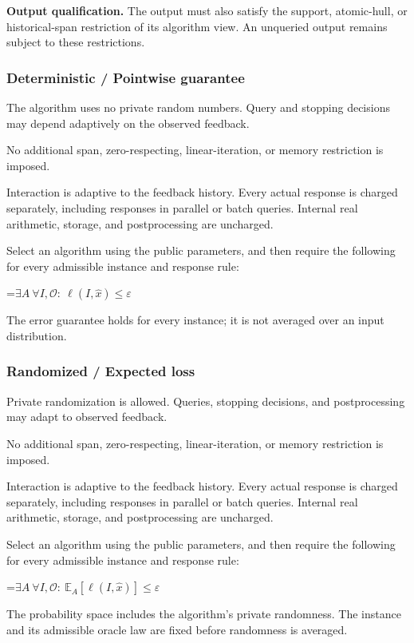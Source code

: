 \documentclass[10pt,a4paper]{article}
\newcommand{\AtlasMath}[1]{\par\begingroup\centering\setbox0=\hbox{$\displaystyle #1$}\ifdim\wd0>1.4\linewidth\typeout{ATLAS WIDE FORMULA: \the\wd0}\fi\ifdim\wd0>\linewidth\resizebox{\linewidth}{!}{\box0}\else\box0\fi\par\endgroup}
\begin{document}
\textbf{Output qualification.} The output must also satisfy the support, atomic-hull, or historical-span restriction of its algorithm view. An unqueried output remains subject to these restrictions.

\subsubsection{Deterministic / Pointwise guarantee}
The algorithm uses no private random numbers. Query and stopping decisions may depend adaptively on the observed feedback.

No additional span, zero-respecting, linear-iteration, or memory restriction is imposed.

Interaction is adaptive to the feedback history. Every actual response is charged separately, including responses in parallel or batch queries. Internal real arithmetic, storage, and postprocessing are uncharged.

Select an algorithm using the public parameters, and then require the following for every admissible instance and response rule:


\AtlasMath{\exists A\ \forall I,\mathcal{O}:\ \ell(I,\widehat{x})\le\varepsilon}


The error guarantee holds for every instance; it is not averaged over an input distribution.

\subsubsection{Randomized / Expected loss}
Private randomization is allowed. Queries, stopping decisions, and postprocessing may adapt to observed feedback.

No additional span, zero-respecting, linear-iteration, or memory restriction is imposed.

Interaction is adaptive to the feedback history. Every actual response is charged separately, including responses in parallel or batch queries. Internal real arithmetic, storage, and postprocessing are uncharged.

Select an algorithm using the public parameters, and then require the following for every admissible instance and response rule:


\AtlasMath{\exists A\ \forall I,\mathcal{O}:\ \mathbb{E}_A[\ell(I,\widehat{x})]\le\varepsilon}


The probability space includes the algorithm's private randomness. The instance and its admissible oracle law are fixed before randomness is averaged.
\end{document}
